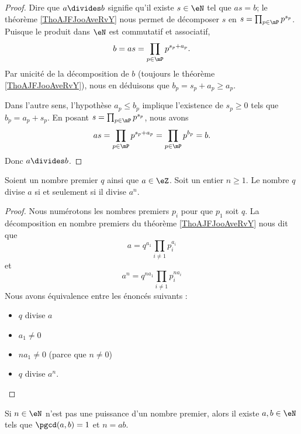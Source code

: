 \begin{proof}
	Dire que \( a\divides b\) signifie qu'il existe \( s\in \eN\) tel que \( as=b\); le théorème \ref{ThoAJFJooAveRvY} nous permet de décomposer \( s\) en \( s=\prod_{p\in\mP}p^{s_p}\). Puisque le produit dans \( \eN\) est commutatif et associatif,
	\begin{equation}
		b=as=\prod_{p\in\mP}p^{s_p+a_p}.
	\end{equation}
	Par unicité de la décomposition de \( b\) (toujours le théorème \ref{ThoAJFJooAveRvY}), nous en déduisons que \( b_p=s_p+a_p\geq a_p\).

	Dans l'autre sens, l'hypothèse \( a_p\leq b_p\) implique l'existence de \( s_p\geq 0\) tels que \( b_p=a_p+s_p\). En posant \( s=\prod_{p\in\mP}p^{s_p}\), nous avons
	\begin{equation}
		as=\prod_{p\in\mP}p^{s_p+a_p}=\prod_{p\in \mP}p^{b_p}=b.
	\end{equation}
	Donc \( a\divides b\).
\end{proof}

\begin{lemma}       \label{LEMooGLZHooUcRNgu}
	Soient un nombre premier \( q\) ainsi que \( a\in \eZ\). Soit un entier \( n\geq 1\). Le nombre \( q\) divise \( a\) si et seulement si il divise \( a^n\).
\end{lemma}

\begin{proof}
	Nous numérotons les nombres premiers \( p_i\) pour que \( p_1\) soit \( q\). La décomposition en nombre premiers du théorème \ref{ThoAJFJooAveRvY} nous dit que
	\begin{equation}
		a=q^{a_1}\prod_{i\neq 1}p_i^{a_i}
	\end{equation}
	et
	\begin{equation}
		a^n=q^{na_1}\prod_{i\neq 1}p_i^{na_i}
	\end{equation}
	Nous avons équivalence entre les énoncés suivants :
	\begin{itemize}
		\item \( q\) divise \( a\)
		\item \( a_1\neq 0\)
		\item \( na_1\neq 0\) (parce que \( n\neq 0\))
		\item \( q\) divise \( a^n\).
	\end{itemize}
\end{proof}

\begin{corollary}		\label{CORooWBSQooQOEmaC}
	Si \( n\in \eN\) n'est pas une puissance d'un nombre premier, alors il existe \( a,b\in \eN\) tels que \( \pgcd(a,b)=1\) et \( n=ab\).
\end{corollary}

